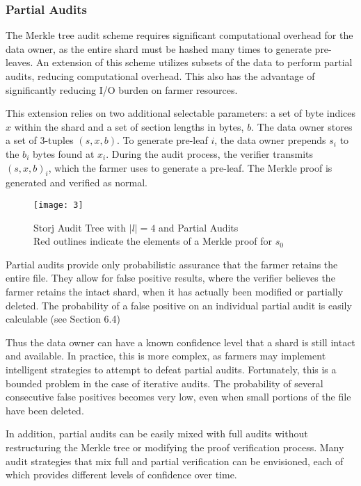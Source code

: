 \documentclass[a4paper,10pt]{article}
\begin{document}
\subsubsection{Partial Audits}
The Merkle tree audit scheme requires significant computational overhead for the
data owner, as the entire shard must be hashed many times to generate
pre-leaves. An extension of this scheme utilizes subsets of the data to perform
partial audits, reducing computational overhead. This also has the advantage of
significantly reducing I/O burden on farmer resources.

This extension relies on two additional selectable parameters: a set of byte
indices $ x $ within the shard and a set of section lengths in bytes, $ b $. The
data owner stores a set of 3-tuples $ (s, x, b) $. To generate pre-leaf $ i $,
the data owner prepends $ s_{i} $ to the $ b_{i} $ bytes found at $ x_{i} $.
During the audit process, the verifier transmits $ (s, x, b)_{i} $, which the
farmer uses to generate a pre-leaf. The Merkle proof is generated and verified
as normal.

\begin{figure}[hbt]
\centering
\texttt{[image: 3]}
\caption{Storj Audit Tree with $ |l| = 4 $ and Partial Audits\\Red outlines
indicate the elements of a Merkle proof for $ s_{0} $}
\end{figure}

Partial audits provide only probabilistic assurance that the farmer retains the
entire file. They allow for false positive results, where the verifier believes
the farmer retains the intact shard, when it has actually been modified or
partially deleted. The probability of a false positive on an individual partial
audit is easily calculable (see Section 6.4)

Thus the data owner can have a known confidence level that a shard is still
intact and available. In practice, this is more complex, as farmers may
implement intelligent strategies to attempt to defeat partial audits.
Fortunately, this is a bounded problem in the case of iterative audits. The
probability of several consecutive false positives becomes very low, even when
small portions of the file have been deleted.

In addition, partial audits can be easily mixed with full audits without
restructuring the Merkle tree or modifying the proof verification process. Many
audit strategies that mix full and partial verification can be envisioned, each
of which provides different levels of confidence over time.
\end{document}
